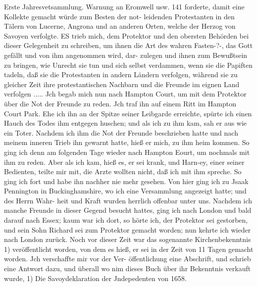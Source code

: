 Erste Jahresvetsammlung. Warnung an Eromwell usw. 141
forderte, damit eine Kollekte gemacht würde zum Besten der not-
leidenden Protestanten in den Tälern von Lucerne, Angrona und
an anderen Orten, welche der Herzog von Savoyen verfolgte.
ES trieb mich, dem Protektor und den obersten Behörden bei
dieser Gelegenheit zu schreiben, um ihnen die Art des wahren
Fasten-?-, das Gott gefällt und von ihm angenommen wird, dar-
zulegen und ihnen zum Bewußtsein zu bringen, wie Unrecht sie
tun und sich selbst verdammen, wenn sie die Papiften tadeln,
daß sie die Protestanten in andern Ländern verfolgen, während
sie zu gleicher Zeit ihre protestantischen Nachbarn und die
Freunde im eignen Land verfolgen .....
Jch begab mich nun nach Hampton Court, um mit dem
Protektor über die Not der Freunde zu reden. Jch traf ihn auf
einem Ritt im Hampton Court Park. Ehe ich ihn an der Spitze
seiner Leibgarde erreichte, spürte ich einen Hauch des Todes
ihm entgegen huschen; und als ich zu ihm kam, sah er aus wie
ein Toter. Nachdem ich ihm die Not der Freunde beschrieben
hatte und nach meinem inneren Trieb ihn gewarnt hatte, hieß
er mich, zu ihm heim kommen. So ging ich denn am folgenden
Tage wieder nach Hampton Eourt, um nochmals mit ihm zu
reden. Aber als ich kam, hieß es, er sei krank, und Harn-ey,
einer seiner Bedienten, teilte mir mit, die Arzte wollten nicht,
daß ich mit ihm spreche. So ging ich fort und habe ihn nachher
nie mehr gesehen.
Von hier ging ich zu Jsaak Pennington in Buckinghamshire,
wo ich eine Versammlung angezeigt hatte; und des Herrn Wahr-
heit und Kraft wurden herrlich offenbar unter uns. Nachdem
ich manche Freunde in dieser Gegend besucht hattes, ging ich
nach London und bald darauf nach Essex; kaum war ich dort,
so hörte ich, der Protektor sei gestorben, und sein Sohn Richard
sei zum Protektor gemacht worden; nun kehrte ich wieder nach
London zurück.
Noch vor dieser Zeit war das sogenannte Kirchenbekenntnis 1)
veröffentlicht worden, von dem es hieß, er sei in der Zeit von
11 Tagen gemacht worden. Jch verschaffte mir vor der Ver-
öffentlichung eine Abschrift, und schrieb eine Antwort dazu, und
überall wo nim dieses Buch über ihr Bekenntnis verkauft wurde,
1) Die Savoydeklaration der Jndepedenten von 1658.


